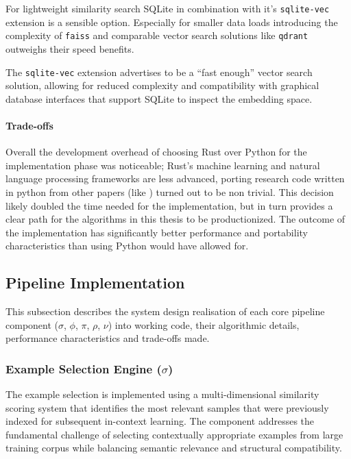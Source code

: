 For lightweight similarity search SQLite in combination with it's
\texttt{sqlite-vec} extension is a sensible option. Especially for smaller data
loads introducing the complexity of \texttt{faiss} and comparable vector search
solutions like \texttt{qdrant} outweighs their speed benefits.

The \texttt{sqlite-vec} extension advertises to be a ``fast enough'' vector
search solution, allowing for reduced complexity and compatibility with
graphical database interfaces that support SQLite to inspect the embedding
space.

\paragraph{Trade-offs}

Overall the development overhead of choosing Rust over Python for the
implementation phase was noticeable; Rust's machine learning and natural
language processing frameworks are less advanced, porting research code written
in python from other papers (like \cite{OmniSQL}) turned out to be non trivial.
This decision likely doubled the time needed for the implementation, but in
turn provides a clear path for the algorithms in this thesis to be
productionized. The outcome of the implementation has significantly better
performance and portability characteristics than using Python would have
allowed for.

\subsection{Pipeline Implementation}

This subsection describes the system design realisation of each core pipeline
component ($\sigma$, $\phi$, $\pi$, $\rho$, $\nu$) into working code, their
algorithmic details, performance characteristics and trade-offs made.

\subsubsection{Example Selection Engine ($\sigma$)}

The example selection is implemented using a multi-dimensional similarity
scoring system that identifies the most relevant samples that were previously
indexed for subsequent in-context learning. The component addresses the
fundamental challenge of selecting contextually appropriate examples from large
training corpus while balancing semantic relevance and structural compatibility.

